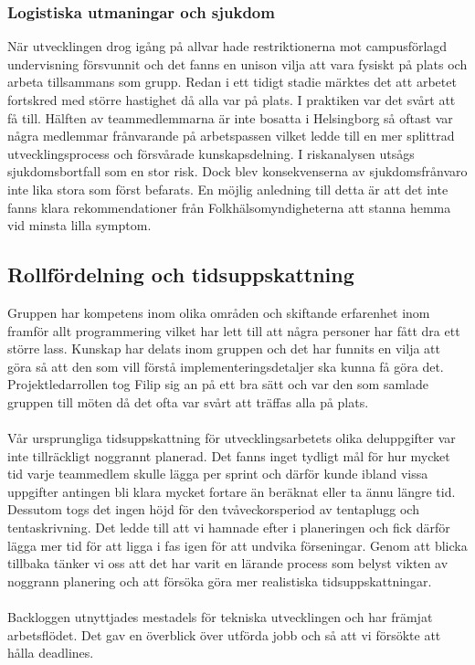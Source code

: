 \documentclass[12pt]{article}
\begin{document}
\subsubsection{Logistiska utmaningar och sjukdom}

När utvecklingen drog igång på allvar hade restriktionerna mot campusförlagd undervisning försvunnit och det fanns en unison vilja att vara fysiskt på plats och arbeta tillsammans som grupp. Redan i ett tidigt stadie märktes det att arbetet fortskred med större hastighet då alla var på plats. I praktiken var det svårt att få till. Hälften av teammedlemmarna är inte bosatta i Helsingborg så oftast var några medlemmar frånvarande på arbetspassen vilket ledde till en mer splittrad utvecklingsprocess och försvårade kunskapsdelning. I riskanalysen utsågs sjukdomsbortfall som en stor risk. Dock blev konsekvenserna av sjukdomsfrånvaro inte lika stora som först befarats. En möjlig anledning till detta är att det inte fanns klara rekommendationer från Folkhälsomyndigheterna att stanna hemma vid minsta lilla symptom.

\subsection{Rollfördelning och tidsuppskattning}

Gruppen har kompetens inom olika områden och skiftande erfarenhet inom framför allt programmering vilket har lett till att några personer har fått dra ett större lass. Kunskap har delats inom gruppen och det har funnits en vilja att göra så att den som vill förstå implementeringsdetaljer ska kunna få göra det. Projektledarrollen tog Filip sig an på ett bra sätt och var den som samlade gruppen till möten då det ofta var svårt att träffas alla på plats.\\\\
Vår ursprungliga tidsuppskattning för utvecklingsarbetets olika deluppgifter var inte tillräckligt noggrannt planerad. Det fanns inget tydligt mål för hur mycket tid varje teammedlem skulle lägga per sprint och därför kunde ibland vissa uppgifter antingen bli klara mycket fortare än beräknat eller ta ännu längre tid. Dessutom togs det ingen höjd för den tvåveckorsperiod av tentaplugg och tentaskrivning. Det ledde till att vi hamnade efter i planeringen och fick därför lägga mer tid för att ligga i fas igen för att undvika förseningar. Genom att blicka tillbaka tänker vi oss att det har varit en lärande process som belyst vikten av noggrann planering och att försöka göra mer realistiska tidsuppskattningar. \\\\
Backloggen utnyttjades mestadels för tekniska utvecklingen och har främjat arbetsflödet. Det gav en överblick över utförda jobb och så att vi försökte att hålla deadlines.\\\
\end{document}
